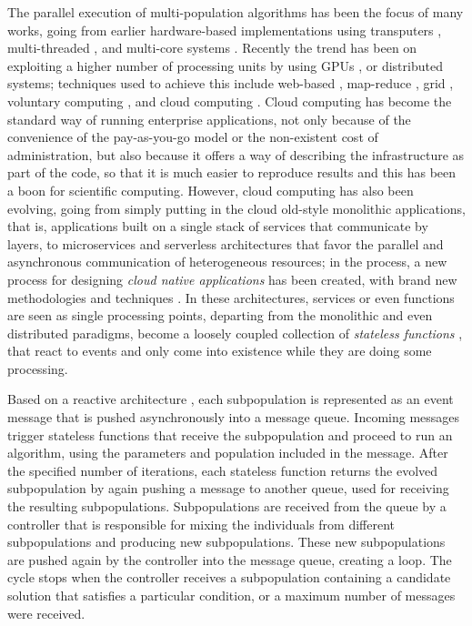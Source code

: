 \documentclass[review]{elsarticle}
\begin{document}
The parallel execution of multi-population algorithms has been the focus of many
works,  going from earlier hardware-based implementations using transputers \cite{gorges1990explicit},
multi-threaded \cite{merelo2019scaling}, and multi-core systems \cite{Serrano2008,lai2019adaptive}. %
Recently the trend has been on exploiting a higher number of processing units 
by using GPUs \cite{tan2015survey,li2007efficient}, or distributed systems; techniques used to achieve this include 
web-based \cite{JSON}, map-reduce \cite{fazenda2012},  grid \cite{munawar2010design,Gonzalez09}, 
voluntary computing \cite{MilkyWay}, and cloud computing 
\cite{GValdez2015,salza2019speed,valenzuela2015implementing,Sherry2012,FlexGP}. %
Cloud computing has become the standard way of running enterprise applications, not
only because of the convenience of the pay-as-you-go model or the non-existent
cost of administration, but also because it offers a way of describing the
infrastructure as part of the code, so that it is much easier to reproduce
results and this has been a boon for scientific computing.  However,  cloud computing
has also been evolving, going from simply putting in the cloud old-style monolithic applications, that is,
applications built on a single stack of services that communicate by layers, to
microservices \cite{microservices} and serverless architectures \cite{varghese2018next, Varghese2018849} that favor the parallel and
asynchronous communication of heterogeneous resources; in the process, 
a new process for designing {\em cloud native applications} has been created, 
with brand new methodologies and techniques \cite{Baldini2016287}. In these architectures,
services or even functions are seen as single processing points,  departing
from the monolithic and even distributed paradigms, become a loosely coupled collection of 
{\em stateless functions} \cite{malawski2017serverless}, that react to events and only come into existence while they 
are doing some processing. %

Based on a reactive architecture \cite{guervos2018introducing} , each
subpopulation is represented as an event message that is pushed asynchronously
into a message queue. Incoming messages trigger stateless functions that receive
the subpopulation and proceed to run an algorithm, using the parameters and
population included in the message. After the specified number of iterations,
each stateless function returns the evolved subpopulation by again pushing a
message to another queue, used for receiving the resulting subpopulations.
Subpopulations are received from the queue by a controller that is responsible
for mixing the individuals from different subpopulations and producing new
subpopulations. These new subpopulations are pushed again by the controller into
the message queue, creating a loop. The cycle stops when the controller receives
a subpopulation containing a candidate solution that satisfies a particular
condition, or a maximum number of messages were received.
\end{document}
